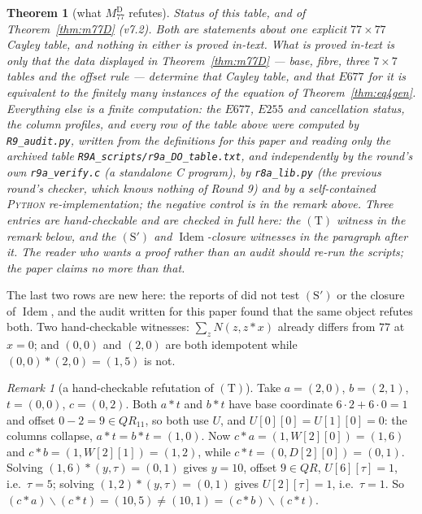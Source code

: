 \documentclass[11pt]{article}
\theoremstyle{plain}
\newtheorem{theorem}{Theorem}[section]
\theoremstyle{definition}
\theoremstyle{remark}
\newtheorem*{remark*}{Remark}
\numberwithin{equation}{section}
\newcommand{\op}{\mathbin{*}}
\newcommand{\Idem}{\operatorname{Idem}}
\begin{document}
\begin{theorem}[what $M_{77}^{\mathrm{D}}$ refutes]
\emph{Status of this table, and of Theorem~\ref{thm:m77D} (v7.2).} Both are
statements about one explicit $77\times77$ Cayley table, and \emph{nothing in
either is proved in-text}. What is proved in-text is only that the data
displayed in Theorem~\ref{thm:m77D} --- base, fibre, three $7\times7$ tables and
the offset rule --- determine that Cayley table, and that $E677$ for it is
equivalent to the finitely many instances of the equation of
Theorem~\ref{thm:eq4gen}. Everything else is a finite computation: the $E677$,
$E255$ and cancellation status, the column profiles, and every row of the table
above were computed by \texttt{R9\_audit.py}, written from the definitions for
this paper and reading only the archived table
\texttt{R9A\_scripts/r9a\_DO\_table.txt}, and independently by the round's own
\texttt{r9a\_verify.c} (a standalone C program), by \texttt{r8a\_lib.py} (the
\emph{previous} round's checker, which knows nothing of Round 9) and by a
self-contained \textsc{Python} re-implementation; the negative control is in the
remark above. Three entries are hand-checkable and are checked in full here: the
$(\mathrm{T})$ witness in the remark below, and the $(\mathrm{S}')$ and
$\Idem$-closure witnesses in the paragraph after it. The reader who wants a
proof rather than an audit should re-run the scripts; the paper claims no more
than that.
\end{theorem}

The last two rows are new here: the reports of \cite{R9A} did not test
$(\mathrm{S}')$ or the closure of $\Idem$, and the audit written for this paper
found that the same object refutes both. Two hand-checkable witnesses:
$\sum_zN(z,z\op x)$ already differs from $77$ at $x = 0$; and $(0,0)$ and $(2,0)$
are both idempotent while $(0,0)\op(2,0) = (1,5)$ is not.

\begin{remark*}[a hand-checkable refutation of $(\mathrm{T})$]
Take $a = (2,0)$, $b = (2,1)$, $t = (0,0)$, $c = (0,2)$. Both $a\op t$ and
$b\op t$ have base coordinate $6\cdot2+6\cdot0 = 1$ and offset $0-2 = 9\in QR_{11}$,
so both use $U$, and $U[0][0] = U[1][0] = 0$: the columns collapse,
$a\op t = b\op t = (1,0)$. Now $c\op a = (1,W[2][0]) = (1,6)$ and
$c\op b = (1,W[2][1]) = (1,2)$, while $c\op t = (0,D[2][0]) = (0,1)$. Solving
$(1,6)\op(y,\tau) = (0,1)$ gives $y = 10$, offset $9\in QR$, $U[6][\tau] = 1$,
i.e.\ $\tau = 5$; solving $(1,2)\op(y,\tau) = (0,1)$ gives $U[2][\tau] = 1$, i.e.\
$\tau = 1$. So $(c\op a)\backslash(c\op t) = (10,5)\ne(10,1) = (c\op b)\backslash(c\op t)$.
\end{remark*}
\end{document}
